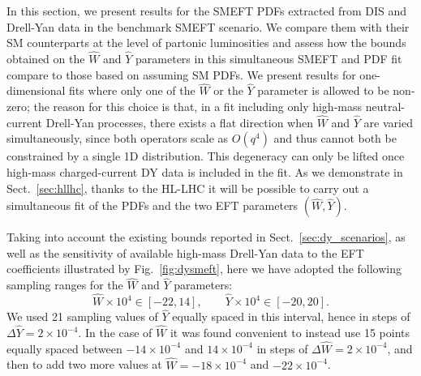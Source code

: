 \documentclass[withindex,glossary]{cam-thesis}
\begin{document}
In this section, we present results for the SMEFT PDFs extracted from DIS and Drell-Yan
data in the benchmark SMEFT scenario. We compare them with their SM counterparts at the level
of partonic luminosities
and assess how the bounds obtained on the $\hat{W}$ and $\hat{Y}$
parameters in this simultaneous SMEFT and PDF fit compare to those based on assuming SM PDFs.
We present results for one-dimensional fits where only one of the $\hat{W}$ or the $\hat{Y}$
parameter is allowed to be non-zero; the reason for this choice is that, in a fit including only high-mass neutral-current
Drell-Yan processes, there exists a flat direction when $\hat{W}$ and $\hat{Y}$ are varied
simultaneously, since both operators scale as $O(q^4)$ and thus cannot both be constrained by a single 1D distribution.
%
This degeneracy can only be lifted once high-mass charged-current DY data is included in the fit.
%
As we  demonstrate in Sect.~\ref{sec:hllhc}, thanks to the HL-LHC it will be possible 
to carry out a simultaneous fit of the PDFs and the two EFT parameters $(\hat{W},\hat{Y}) $.

Taking into account the existing bounds reported in Sect.~\ref{sec:dy_scenarios},
as well as the sensitivity of available high-mass Drell-Yan
data to the EFT coefficients illustrated by Fig.~\ref{fig:dysmeft}, here we have adopted
the following sampling ranges for the $\hat{W}$ and $\hat{Y}$ parameters:
\begin{equation}
\label{eq:samplingrange}
 \hat{W}\times 10^4 \in \left[ -22, 14 \right], \qquad  \hat{Y}\times 10^4 \in \left[ -20, 20 \right].
\end{equation}
We used 21 sampling values of $\hat{Y}$ equally spaced in this interval,
hence in steps of $\Delta \hat{Y}=2\times 10^{-4}$.
%
In the case of $\hat{W}$ it was found convenient to instead use
15 points equally spaced between $-14\times 10^{-4}$ and $14\times 10^{-4}$
in steps of $\Delta \hat{W}=2\times 10^{-4}$,
and then to add two more values at $\hat{W}=-18\times 10^{-4}$ and $-22\times 10^{-4}$.
\end{document}
